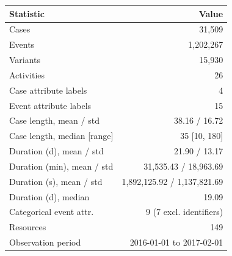 \begin{tabular}{@{}lr@{}}
\toprule
Statistic & Value \\
\midrule
Cases & 31,509 \\
Events & 1,202,267 \\
Variants & 15,930 \\
Activities & 26 \\
Case attribute labels & 4 \\
Event attribute labels & 15 \\
Case length, mean / std & 38.16 / 16.72 \\
Case length, median [range] & 35 [10, 180] \\
Duration (d), mean / std & 21.90 / 13.17 \\
Duration (min), mean / std & 31,535.43 / 18,963.69 \\
Duration (s), mean / std & 1,892,125.92 / 1,137,821.69 \\
Duration (d), median & 19.09 \\
Categorical event attr. & 9 (7 excl. identifiers) \\
Resources & 149 \\
Observation period & 2016-01-01 to 2017-02-01 \\
\bottomrule
\end{tabular}
